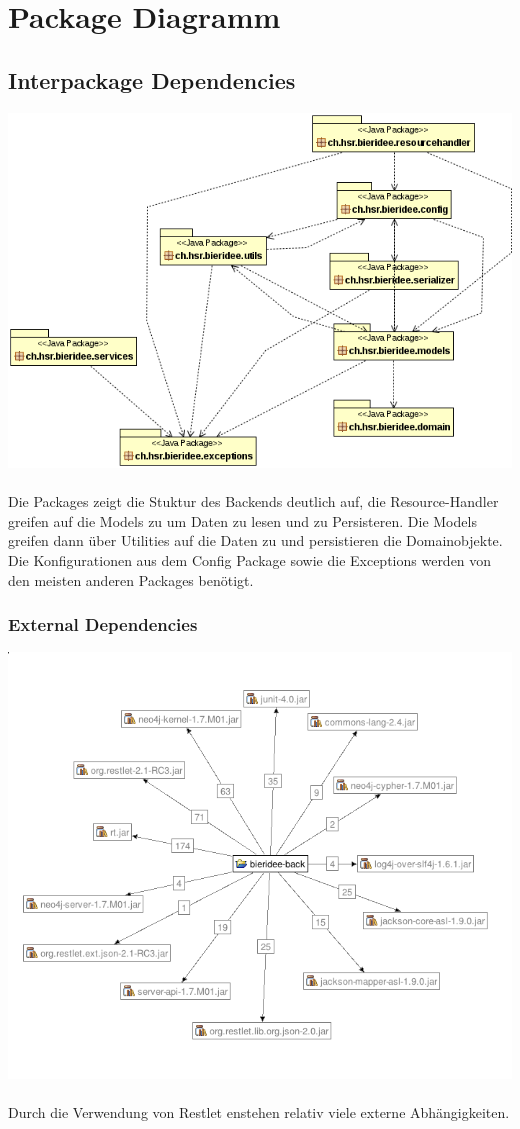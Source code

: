 \documentclass[10pt,a4paper]{scrartcl}
\begin{document}
\newpage

\section{Package Diagramm}
\subsection{Interpackage Dependencies}
\includegraphics[width=\textwidth]{Package-Diagramm.png}\\
\\
Die Packages zeigt die Stuktur des Backends deutlich auf, die Resource-Handler greifen  
auf die Models zu um Daten zu lesen und zu Persisteren. Die Models greifen dann über Utilities
auf die Daten zu und persistieren die Domainobjekte.\\
Die Konfigurationen aus dem Config Package sowie die Exceptions werden von den meisten anderen
Packages benötigt.

\subsubsection{External Dependencies}
\includegraphics[scale=0.7, width=\textwidth]{dependecies.png}\\
\\
Durch die Verwendung von Restlet enstehen relativ viele externe Abhängigkeiten.
\end{document}
